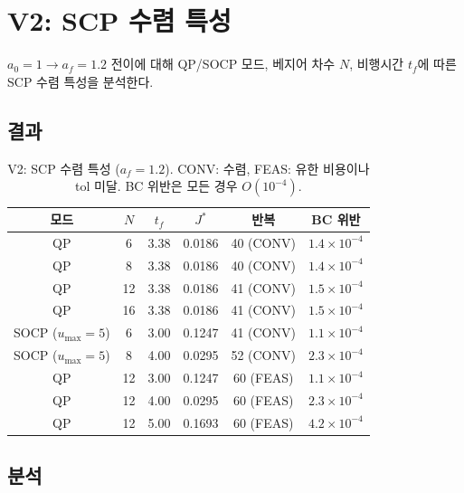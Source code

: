 \documentclass[11pt]{article}
\begin{document}
\section{V2: SCP 수렴 특성}
\label{sec:v2}

$a_0=1 \to a_f=1.2$ 전이에 대해 QP/SOCP 모드, 베지어 차수 $N$,
비행시간 $t_f$에 따른 SCP 수렴 특성을 분석한다.

\subsection{결과}

\begin{table}[h]
\centering
\caption{V2: SCP 수렴 특성 ($a_f=1.2$). CONV: 수렴, FEAS: 유한 비용이나 tol 미달.
BC 위반은 모든 경우 $O(10^{-4})$.}
\label{tab:v2}
\small
\begin{tabular}{@{}cccccc@{}}
\toprule
모드 & $N$ & $t_f$ & $J^*$ & 반복 & BC 위반 \\
\midrule
QP & 6 & 3.38 & 0.0186 & 40 (CONV) & $1.4\times 10^{-4}$ \\
QP & 8 & 3.38 & 0.0186 & 40 (CONV) & $1.4\times 10^{-4}$ \\
QP & 12 & 3.38 & 0.0186 & 41 (CONV) & $1.5\times 10^{-4}$ \\
QP & 16 & 3.38 & 0.0186 & 41 (CONV) & $1.5\times 10^{-4}$ \\
\midrule
SOCP ($u_{\max}=5$) & 6 & 3.00 & 0.1247 & 41 (CONV) & $1.1\times 10^{-4}$ \\
SOCP ($u_{\max}=5$) & 8 & 4.00 & 0.0295 & 52 (CONV) & $2.3\times 10^{-4}$ \\
\midrule
QP & 12 & 3.00 & 0.1247 & 60 (FEAS) & $1.1\times 10^{-4}$ \\
QP & 12 & 4.00 & 0.0295 & 60 (FEAS) & $2.3\times 10^{-4}$ \\
QP & 12 & 5.00 & 0.1693 & 60 (FEAS) & $4.2\times 10^{-4}$ \\
\bottomrule
\end{tabular}
\end{table}

\subsection{분석}
\end{document}
